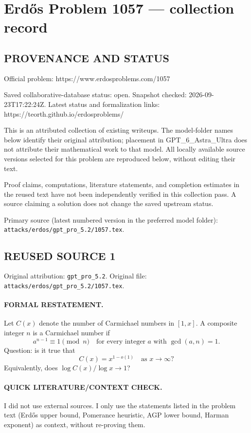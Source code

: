 \section*{Erd\H{o}s Problem 1057 --- collection record}

\subsection*{PROVENANCE AND STATUS}
Official problem: https://www.erdosproblems.com/1057

Saved collaborative-database status: open.
Snapshot checked: 2026-09-23T17:22:24Z.
Latest status and formalization links: https://teorth.github.io/erdosproblems/

This is an attributed collection of existing writeups. The model-folder names below identify their original attribution; placement in GPT\_6\_Astra\_Ultra does not attribute their mathematical work to that model. All locally available source versions selected for this problem are reproduced below, without editing their text.

Proof claims, computations, literature statements, and completion estimates in the reused text have not been independently verified in this collection pass. A source claiming a solution does not change the saved upstream status.

Primary source (latest numbered version in the preferred model folder): \texttt{attacks/erdos/gpt\_pro\_5.2/1057.tex}.

\subsection*{REUSED SOURCE 1}
Original attribution: \texttt{gpt\_pro\_5.2}.
Original file: \texttt{attacks/erdos/gpt\_pro\_5.2/1057.tex}.


\paragraph{FORMAL RESTATEMENT.}
Let $C(x)$ denote the number of Carmichael numbers in $[1,x]$.
A composite integer $n$ is a Carmichael number if
\[
a^{n-1}\equiv 1\pmod n\quad\text{for every integer }a\text{ with }\gcd(a,n)=1.
\]
Question: is it true that
\[
C(x)=x^{1-o(1)}\quad\text{as }x\to\infty?
\]
Equivalently, does $\log C(x)/\log x \to 1$?

\paragraph{QUICK LITERATURE/CONTEXT CHECK.}
I did not use external sources. I only use the statements listed in the problem text (Erd\H{o}s upper bound, Pomerance heuristic, AGP lower bound, Harman exponent) as context, without re-proving them.

